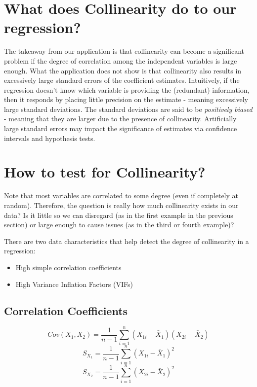 \documentclass[
]{book}
\begin{document}
\section{What does Collinearity do to our regression?}\label{what-does-collinearity-do-to-our-regression}

The takeaway from our application is that collinearity can become a significant problem if the degree of correlation among the independent variables is large enough. What the application does not show is that collinearity also results in excessively large standard errors of the coefficient estimates. Intuitively, if the regression doesn't know which variable is providing the (redundant) information, then it responds by placing little precision on the estimate - meaning excessively large standard deviations. The standard deviations are said to be \emph{positively biased} - meaning that they are larger due to the presence of collinearity. Artificially large standard errors may impact the significance of estimates via confidence intervals and hypothesis tests.

\section{How to test for Collinearity?}\label{how-to-test-for-collinearity}

Note that most variables are correlated to some degree (even if completely at random). Therefore, the question is really how much collinearity exists in our data? Is it little so we can disregard (as in the first example in the previous section) or large enough to cause issues (as in the third or fourth example)?

There are two data characteristics that help detect the degree of collinearity in a regression:

\begin{itemize}
\item
  High simple correlation coefficients
\item
  High Variance Inflation Factors (VIFs)
\end{itemize}

\subsection*{Correlation Coefficients}\label{correlation-coefficients}

\[Cov(X_1,X_2)=\frac{1}{n-1} \sum_{i=1}^n (X_{1i}-\bar{X}_1)(X_{2i}-\bar{X}_2)\]
\[S_{X_1} = \frac{1}{n-1} \sum_{i=1}^n (X_{1i}-\bar{X}_1)^2\]
\[S_{X_2} = \frac{1}{n-1} \sum_{i=1}^n (X_{2i}-\bar{X}_2)^2\]
\end{document}
